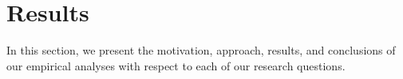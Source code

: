 \section{Results} \label{sec:ch5results}

In this section, we present the motivation, approach, results, and conclusions of our empirical
analyses with respect to each of our research questions.





